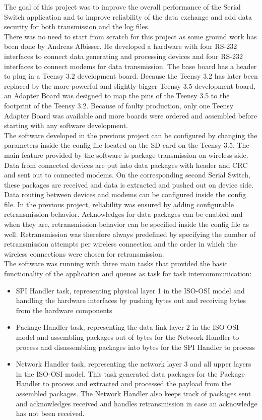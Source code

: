 %
The goal of this project was to improve the overall performance of the Serial Switch application and to improve reliability of the data exchange and add data security for both transmission and the log files.\\
There was no need to start from scratch for this project as some ground work has been done by Andreas Albisser. He developed a hardware with four RS-232 interfaces to connect data generating and processing devices and four RS-232 interfaces to connect modems for data transmission. The base
board has a header to plug in a Teensy 3.2 development board. Because the Teensy 3.2 has later been replaced by the more powerful and slightly bigger Teensy 3.5 development board, an Adapter Board was designed to map the pins of the Teensy 3.5 to the footprint of the Teensy 3.2. Because of faulty production, only one Teensy Adapter Board was available and more boards were ordered and assembled before starting with any software development.\\
The software developed in the previous project can be configured by changing the parameters inside the config file located on the SD card on the Teensy 3.5. The main feature provided by the software is package transmission on wireless side. Data from connected devices are put into data packages with header and CRC and sent out to connected modems. On the corresponding second Serial Switch, these packages are received and data is extracted and pushed out on device side. Data routing between devices and modems can be configured inside the config file. In the previous project, reliability was ensured by adding configurable retransmission behavior. Acknowledges for data packages can be enabled and when they are, retransmission behavior can be specified inside the config file as well. Retransmission was therefore always predefined by specifying the number of retransmission attempts per wireless connection and the order in which the wireless connections were chosen for retransmission.\\
The software was running with three main tasks that provided the basic functionality of the application and queues as task for task intercommunication:
\begin{itemize}
    \item SPI Handler task, representing physical layer 1 in the ISO-OSI model and handling the hardware interfaces by pushing bytes out and receiving bytes from the hardware components
    \item Package Handler task, representing the data link layer 2 in the ISO-OSI model and assembling packages out of bytes for the Network Handler to process and disassembling packages into bytes for the SPI Handler to process
    \item Network Handler task, representing the network layer 3 and all upper layers in the ISO-OSI model. This task generated data packages for the Package Handler to process and extracted and processed the payload from the assembled packages. The Network Handler also keeps track of packages sent and acknowledges received and handles retransmission in case an acknowledge has not been received.
\end{itemize}

